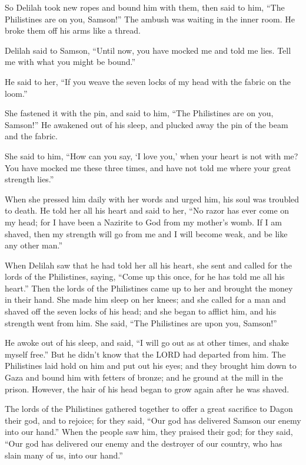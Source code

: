  So Delilah took new ropes and bound him with them, then
said to him, ``The Philistines are on you, Samson!'' The ambush was
waiting in the inner room. He broke them off his arms like a thread.

 Delilah said to Samson, ``Until now, you have mocked me
and told me lies. Tell me with what you might be bound.''

He said to her, ``If you weave the seven locks of my head with the
fabric on the loom.''

 She fastened it with the pin, and said to him, ``The
Philistines are on you, Samson!'' He awakened out of his sleep, and
plucked away the pin of the beam and the fabric.

 She said to him, ``How can you say, `I love you,' when
your heart is not with me? You have mocked me these three times, and
have not told me where your great strength lies.''

 When she pressed him daily with her words and urged him,
his soul was troubled to death.  He told her all his
heart and said to her, ``No razor has ever come on my head; for I have
been a Nazirite to God from my mother's womb. If I am shaved, then my
strength will go from me and I will become weak, and be like any other
man.''

 When Delilah saw that he had told her all his heart, she
sent and called for the lords of the Philistines, saying, ``Come up this
once, for he has told me all his heart.'' Then the lords of the
Philistines came up to her and brought the money in their hand.
 She made him sleep on her knees; and she called for a
man and shaved off the seven locks of his head; and she began to afflict
him, and his strength went from him.  She said, ``The
Philistines are upon you, Samson!''

He awoke out of his sleep, and said, ``I will go out as at other times,
and shake myself free.'' But he didn't know that the LORD had departed
from him.  The Philistines laid hold on him and put out
his eyes; and they brought him down to Gaza and bound him with fetters
of bronze; and he ground at the mill in the prison. 
However, the hair of his head began to grow again after he was shaved.

 The lords of the Philistines gathered together to offer
a great sacrifice to Dagon their god, and to rejoice; for they said,
``Our god has delivered Samson our enemy into our hand.''
 When the people saw him, they praised their god; for
they said, ``Our god has delivered our enemy and the destroyer of our
country, who has slain many of us, into our hand.''

